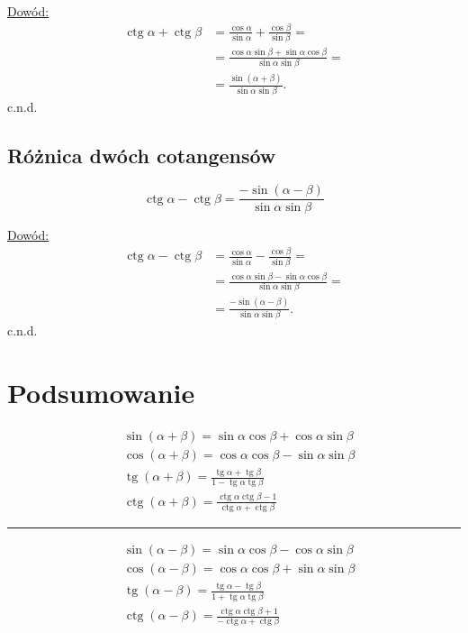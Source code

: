 \documentclass[12pt,a4paper,fleqn]{article}
\DeclareMathOperator{\tg}{tg}
\DeclareMathOperator{\ctg}{ctg}
\begin{document}
		\underline{Dowód:} \noindent
		\begin{align*}
			\ctg\alpha + \ctg\beta &= \frac{\cos\alpha}{\sin\alpha} + \frac{\cos\beta}{\sin\beta} = \\
			    			  	   &= \frac{\cos\alpha\sin\beta+\sin\alpha\cos\beta}{\sin\alpha\sin\beta} =\\
			    			  	  &=\frac{\sin(\alpha+\beta)}{\sin\alpha\sin\beta}.
		\end{align*}
		c.n.d.
	\subsection{Różnica dwóch cotangensów}
		\begin{equation*}
			\ctg\alpha - \ctg\beta = \frac{-\sin(\alpha-\beta)}{\sin\alpha\sin\beta}
		\end{equation*}
		
		\underline{Dowód:} \noindent
		\begin{align*}
			\ctg\alpha - \ctg\beta &= \frac{\cos\alpha}{\sin\alpha} - \frac{\cos\beta}{\sin\beta} = \\
			    			  	   &= \frac{\cos\alpha\sin\beta-\sin\alpha\cos\beta}{\sin\alpha\sin\beta} =\\
			    			  	  &= \frac{-\sin(\alpha-\beta)}{\sin\alpha\sin\beta}.
		\end{align*}
		c.n.d.	
		
		
		
\newpage
\section{Podsumowanie}
	\begin{align*}
		&\sin (\alpha +\beta) = \sin\alpha\cos\beta + \cos\alpha\sin\beta\\
		&\cos (\alpha + \beta) = \cos\alpha\cos\beta - \sin\alpha\sin\beta\\
		&\tg (\alpha + \beta) = \frac{\tg \alpha + \tg \beta}{1 - \tg \alpha \tg \beta}\\
		&\ctg (\alpha + \beta) = \frac{\ctg\alpha\ctg\beta-1}{\ctg\alpha+\ctg\beta}
	\end{align*}
	
	
	\noindent\rule{10cm}{0.4pt}
	\begin{align*}
		&\sin(\alpha-\beta) = \sin\alpha\cos\beta-\cos\alpha\sin\beta\\
		&\cos(\alpha-\beta) = \cos\alpha\cos\beta + \sin\alpha\sin\beta\\
		&\tg(\alpha-\beta)= \frac{\tg \alpha - \tg \beta}{1 + \tg \alpha \tg \beta}\\
		&\ctg (\alpha - \beta) = \frac{\ctg\alpha\ctg\beta+1}{-\ctg\alpha+\ctg\beta}
	\end{align*}
	
\end{document}
